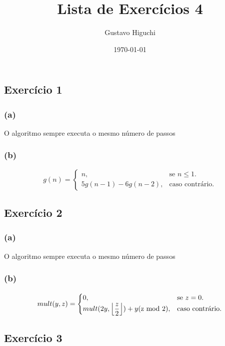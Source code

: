 \documentclass{article}
\title{Lista de Exercícios 4}
\author{Gustavo Higuchi}
\date{\today}
\DeclarePairedDelimiter\floor{\lfloor}{\rfloor}
\begin{document}
\maketitle

\tableofcontents
\newpage


\chapter{}
\section{Exercício 1}
\subsection*{(a)}
O algoritmo sempre executa o mesmo número de passos
\subsection*{(b)}
\begin{equation}
    g(n)=\begin{cases}
    n, & \text{se $n\leq 1$}.\\
    5g(n-1) - 6g(n-2), & \text{caso contrário}.
\end{cases}
\end{equation}

\section{Exercício 2}
\subsection*{(a)}
O algoritmo sempre executa o mesmo número de passos
\subsection*{(b)}
\begin{equation}
    mult(y,z)=\begin{cases}
    0, & \text{se $z = 0$}.\\
    mult(2y, \floor*{\dfrac{z}{2}}) + y(\text{z mod 2}), & \text{caso contrário}.
\end{cases}
\end{equation}

\section{Exercício 3}
\end{document}
